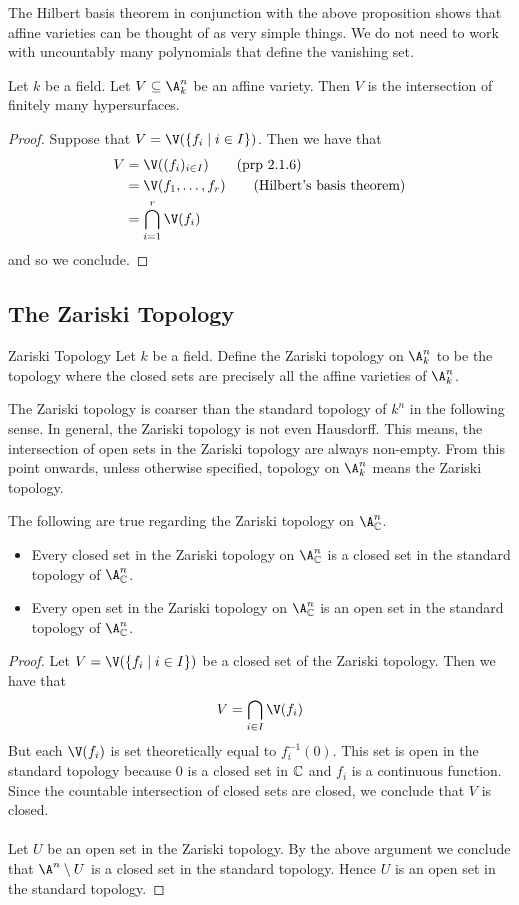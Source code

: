 \documentclass[a4paper]{article}
\begin{document}
The Hilbert basis theorem in conjunction with the above proposition shows that affine varieties can be thought of as very simple things. We do not need to work with uncountably many polynomials that define the vanishing set. 

\begin{crl}{}{} Let $k$ be a field. Let $V\subseteq\A_k^n$ be an affine variety. Then $V$ is the intersection of finitely many hypersurfaces. 
\begin{proof}
Suppose that $V=\V(\{f_i\;|\;i\in I\})$. Then we have that 
\begin{align*}
V&=\V((f_i)_{i\in I})\tag{prp 2.1.6}\\
&=\V(f_1,\dots,f_r)\tag{Hilbert's basis theorem}\\
&=\bigcap_{i=1}^r\V(f_i)
\end{align*}
and so we conclude. 
\end{proof}
\end{crl}

\subsection{The Zariski Topology}
\begin{defn}{Zariski Topology}{} Let $k$ be a field. Define the Zariski topology on $\A_k^n$ to be the topology where the closed sets are precisely all the affine varieties of $\A_k^n$. 
\end{defn}

The Zariski topology is coarser than the standard topology of $k^n$ in the following sense. In general, the Zariski topology is not even Hausdorff. This means, the intersection of open sets in the Zariski topology are always non-empty. From this point onwards, unless otherwise specified, topology on $\A_k^n$ means the Zariski topology. 

\begin{lmm}{}{} The following are true regarding the Zariski topology on $\A_\C^n$. 
\begin{itemize}
\item Every closed set in the Zariski topology on $\A_\C^n$ is a closed set in the standard topology of $\A_\C^n$. 
\item Every open set in the Zariski topology on $\A_\C^n$ is an open set in the standard topology of $\A_\C^n$. 
\end{itemize} 
\begin{proof}
Let $V=\V(\{f_i\;|\;i\in I\})$ be a closed set of the Zariski topology. Then we have that $$V=\bigcap_{i\in I}\V(f_i)$$ But each $\V(f_i)$ is set theoretically equal to $f_i^{-1}(0)$. This set is open in the standard topology because $0$ is a closed set in $\mathbb{C}$ and $f_i$ is a continuous function. Since the countable intersection of closed sets are closed, we conclude that $V$ is closed. \\~\\

Let $U$ be an open set in the Zariski topology. By the above argument we conclude that $\A^n\setminus U$ is a closed set in the standard topology. Hence $U$ is an open set in the standard topology. 
\end{proof}
\end{lmm}
\end{document}
